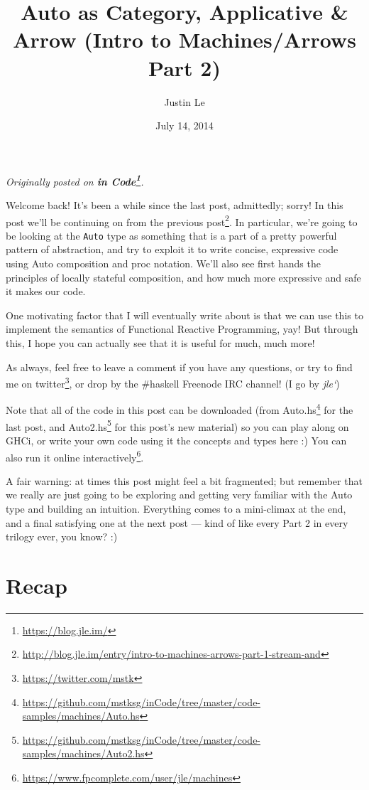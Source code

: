 \documentclass[]{article}
\title{Auto as Category, Applicative \& Arrow (Intro to Machines/Arrows Part 2)}
\author{Justin Le}
\date{July 14, 2014}
\renewcommand{\href}[2]{#2\footnote{\url{#1}}}
\begin{document}
\maketitle

\emph{Originally posted on \textbf{\href{https://blog.jle.im/}{in
Code}}.}

Welcome back! It's been a while since the last post, admittedly; sorry!
In this post we'll be continuing on from
\href{http://blog.jle.im/entry/intro-to-machines-arrows-part-1-stream-and}{the
previous post}. In particular, we're going to be looking at the
\texttt{Auto} type as something that is a part of a pretty powerful
pattern of abstraction, and try to exploit it to write concise,
expressive code using Auto composition and proc notation. We'll also see
first hands the principles of locally stateful composition, and how much
more expressive and safe it makes our code.

One motivating factor that I will eventually write about is that we can
use this to implement the semantics of Functional Reactive Programming,
yay! But through this, I hope you can actually see that it is useful for
much, much more!

As always, feel free to leave a comment if you have any questions, or
try to find me on \href{https://twitter.com/mstk}{twitter}, or drop by
the \#haskell Freenode IRC channel! (I go by \emph{jle`})

Note that all of the code in this post can be downloaded (from
\href{https://github.com/mstksg/inCode/tree/master/code-samples/machines/Auto.hs}{Auto.hs}
for the last post, and
\href{https://github.com/mstksg/inCode/tree/master/code-samples/machines/Auto2.hs}{Auto2.hs}
for this post's new material) so you can play along on GHCi, or write
your own code using it the concepts and types here :) You can also run
it \href{https://www.fpcomplete.com/user/jle/machines}{online
interactively}.

A fair warning: at times this post might feel a bit fragmented; but
remember that we really are just going to be exploring and getting very
familiar with the Auto type and building an intuition. Everything comes
to a mini-climax at the end, and a final satisfying one at the next post
--- kind of like every Part 2 in every trilogy ever, you know? :)

\section{Recap}\label{recap}
\end{document}
